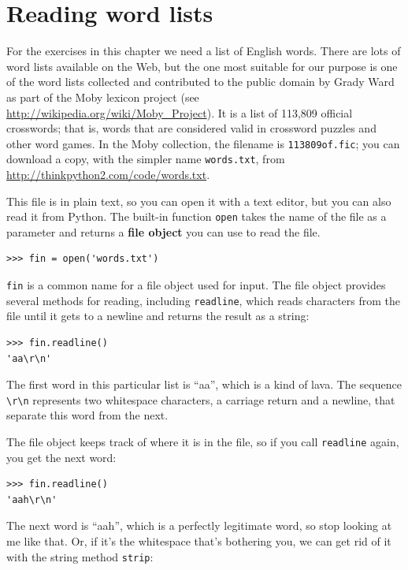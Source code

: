 \documentclass[10pt]{book}
\begin{document}
\section{Reading word lists}
\label{wordlist}

For the exercises in this chapter we need a list of English words.
There are lots of word lists available on the Web, but the one most
suitable for our purpose is one of the word lists collected and
contributed to the public domain by Grady Ward as part of the Moby
lexicon project (see \url{http://wikipedia.org/wiki/Moby_Project}).  It
is a list of 113,809 official crosswords; that is, words that are
considered valid in crossword puzzles and other word games.  In the
Moby collection, the filename is {\tt 113809of.fic}; you can download
a copy, with the simpler name {\tt words.txt}, from
\url{http://thinkpython2.com/code/words.txt}.

This file is in plain text, so you can open it with a text
editor, but you can also read it from Python.  The built-in
function {\tt open} takes the name of the file as a parameter
and returns a {\bf file object} you can use to read the file.

\begin{verbatim}
>>> fin = open('words.txt')
\end{verbatim}
%
{\tt fin} is a common name for a file object used for input.  The file
object provides several methods for reading, including {\tt readline},
which reads characters from the file until it gets to a newline and
returns the result as a string: 

\begin{verbatim}
>>> fin.readline()
'aa\r\n'
\end{verbatim}
%
The first word in this particular list is ``aa'', which is a kind of
lava.  The sequence \verb"\r\n" represents two whitespace characters,
a carriage return and a newline, that separate this word from the
next.

The file object keeps track of where it is in the file, so
if you call {\tt readline} again, you get the next word:

\begin{verbatim}
>>> fin.readline()
'aah\r\n'
\end{verbatim}
%
The next word is ``aah'', which is a perfectly legitimate
word, so stop looking at me like that.
Or, if it's the whitespace that's bothering you,
we can get rid of it with the string method {\tt strip}:
\end{document}
